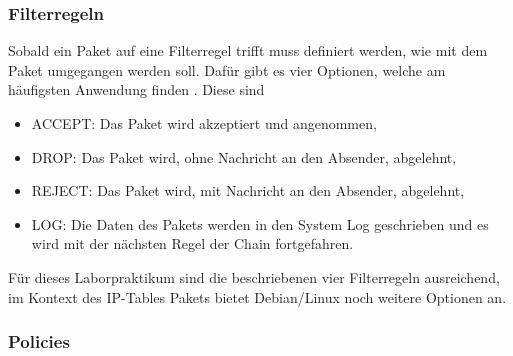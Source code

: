 \documentclass[
a4paper,     %
 headsepline, %
footsepline, %
titlepage,   %
 halfparskip,     %
 fleqn,       %
12pt         %
]{scrartcl}  %
\begin{document}
\begin{table}[!h]
\centering
{}
\caption{IP-Tables: Chains}
\label{IP-Tables: Chains}
\end{table}

\subsubsection{Filterregeln}
Sobald ein Paket auf eine Filterregel trifft muss definiert werden, wie mit dem Paket umgegangen werden soll. Dafür gibt es vier Optionen, welche am häufigsten Anwendung finden \cite{iptables-1}. Diese sind
\begin{itemize}

\item ACCEPT: Das Paket wird akzeptiert und angenommen,
\item DROP: Das Paket wird, ohne Nachricht an den Absender, abgelehnt,
\item REJECT: Das Paket wird, mit Nachricht an den Absender, abgelehnt,
\item LOG: Die Daten des Pakets werden in den System Log geschrieben und es wird mit der nächsten Regel der Chain fortgefahren. 

\end{itemize}

Für dieses Laborpraktikum sind die beschriebenen vier Filterregeln ausreichend, im Kontext des IP-Tables Pakets bietet Debian/Linux noch weitere Optionen an. 
 
\subsubsection{Policies}
\end{document}
